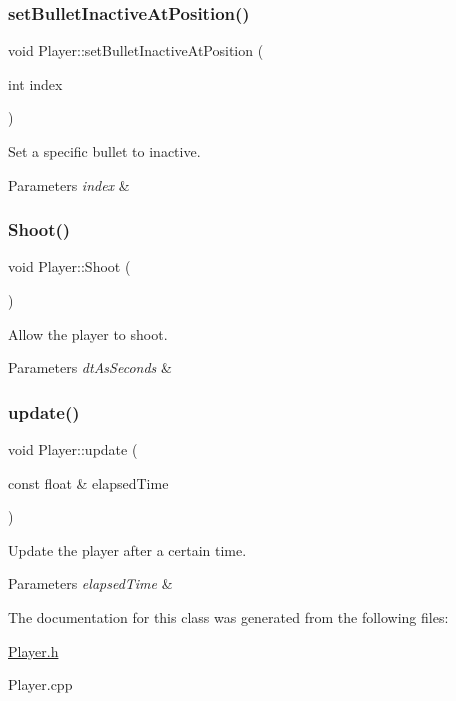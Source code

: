 \subsubsection{\texorpdfstring{set\+Bullet\+Inactive\+At\+Position()}{setBulletInactiveAtPosition()}}
{\footnotesize\ttfamily void Player\+::set\+Bullet\+Inactive\+At\+Position (\begin{DoxyParamCaption}\item[{int}]{index }\end{DoxyParamCaption})}



Set a specific bullet to inactive. 


\begin{DoxyParams}{Parameters}
{\em index} & \\
\hline
\end{DoxyParams}
\mbox{\label{class_player_a2105394431517a41d38140cb65982331}} 
\subsubsection{\texorpdfstring{Shoot()}{Shoot()}}
{\footnotesize\ttfamily void Player\+::\+Shoot (\begin{DoxyParamCaption}{ }\end{DoxyParamCaption})}



Allow the player to shoot. 


\begin{DoxyParams}{Parameters}
{\em dt\+As\+Seconds} & \\
\hline
\end{DoxyParams}
\mbox{\label{class_player_aaccee569406f6180bd5028d058b8579f}} 
\subsubsection{\texorpdfstring{update()}{update()}}
{\footnotesize\ttfamily void Player\+::update (\begin{DoxyParamCaption}\item[{const float \&}]{elapsed\+Time }\end{DoxyParamCaption})}



Update the player after a certain time. 


\begin{DoxyParams}{Parameters}
{\em elapsed\+Time} & \\
\hline
\end{DoxyParams}


The documentation for this class was generated from the following files\+:\begin{DoxyCompactItemize}
\item 
\hyperlink{_player_8h}{Player.\+h}\item 
Player.\+cpp\end{DoxyCompactItemize}
